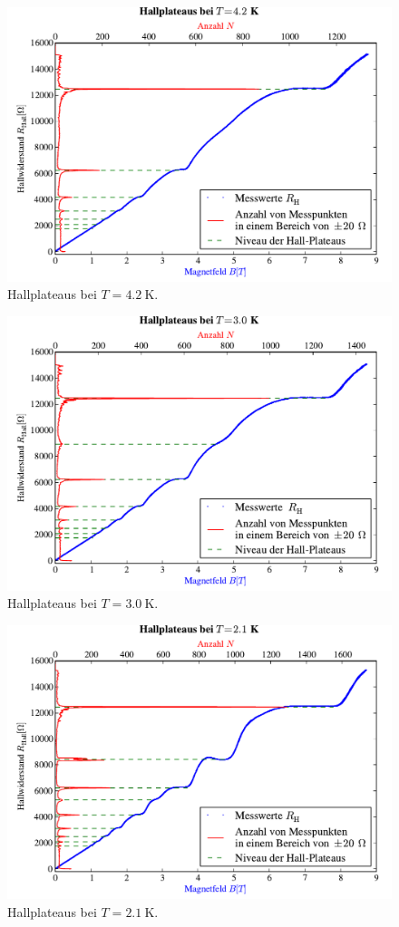 \documentclass[paper=a4,fontsize=10pt,DIV=18,twocolumn,parskip=half]{scrartcl}
\numberwithin{equation}{section}    %
\begin{document}
\begin{figure}[htp]
	\begin{center}
		\includegraphics[width=.5\textwidth]{Data-Plots/02-4,2-Hallplateaus.pdf}
		\caption{Hallplateaus bei $T=\SI{4.2}{\kelvin}$.}
		\label{hallplateau42}
	\end{center}
\end{figure}
\begin{figure}[htp]
	\begin{center}
		\includegraphics[width=.5\textwidth]{Data-Plots/03-3,0-Hallplateaus.pdf}
		\caption{Hallplateaus bei $T=\SI{3.0}{\kelvin}$.}
		\label{hallplateau30}
	\end{center}
\end{figure}
\begin{figure}[htp]
	\begin{center}
		\includegraphics[width=.5\textwidth]{Data-Plots/04-2,1-Hallplateaus.pdf}
		\caption{Hallplateaus bei $T=\SI{2.1}{\kelvin}$.}
		\label{hallplateau21}
	\end{center}
\end{figure}

\end{document}
